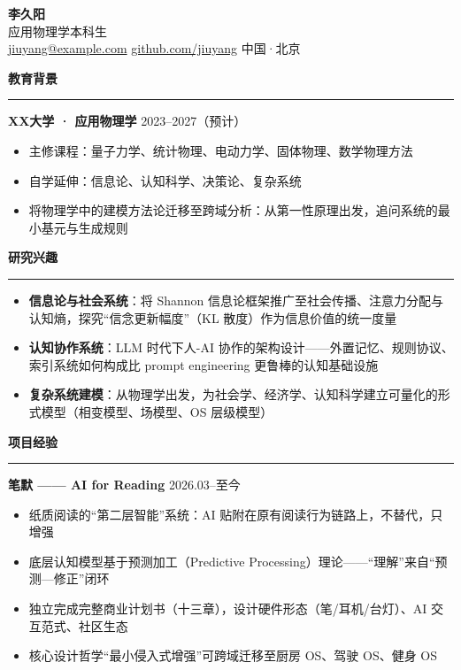 \documentclass[11pt,a4paper]{ctexart}
\newcommand{\cvsection}[1]{
  \vspace{0.8em}
  \noindent
  {\color{primary}\large\textbf{#1}}
  \vspace{0.15em}
  \hrule
  \vspace{0.5em}
}
\newcommand{\cventry}[3]{
  \noindent
  \textbf{#1} \hfill \color{gray}\small #2
  \par\vspace{0.15em}
  \begin{itemize}
    #3
  \end{itemize}
}
\begin{document}
\begin{center}
  {\color{primary}\huge\textbf{李久阳}} \\[0.3em]
  {\large 应用物理学本科生} \\[0.5em]
  {\color{gray}\small
     \href{mailto:jiuyang@example.com}{jiuyang@example.com} \quad
     \href{https://github.com/jiuyang}{github.com/jiuyang} \quad
     中国·北京
  }
\end{center}

\vspace{-0.5em}

\cvsection{ 教育背景}

\cventry{XX大学 · 应用物理学}{2023--2027（预计）}{
  \item 主修课程：量子力学、统计物理、电动力学、固体物理、数学物理方法
  \item 自学延伸：信息论、认知科学、决策论、复杂系统
  \item 将物理学中的建模方法论迁移至跨域分析：从第一性原理出发，追问系统的最小基元与生成规则
}

\cvsection{ 研究兴趣}

\begin{itemize}
  \item \textbf{信息论与社会系统}：将 Shannon 信息论框架推广至社会传播、注意力分配与认知熵，探究“信念更新幅度”（KL 散度）作为信息价值的统一度量
  \item \textbf{认知协作系统}：LLM 时代下人-AI 协作的架构设计——外置记忆、规则协议、索引系统如何构成比 prompt engineering 更鲁棒的认知基础设施
  \item \textbf{复杂系统建模}：从物理学出发，为社会学、经济学、认知科学建立可量化的形式模型（相变模型、场模型、OS 层级模型）
\end{itemize}

\cvsection{ 项目经验}

\cventry{笔默 —— AI for Reading}{2026.03--至今}{
  \item 纸质阅读的“第二层智能”系统：AI 贴附在原有阅读行为链路上，不替代，只增强
  \item 底层认知模型基于预测加工（Predictive Processing）理论——“理解”来自“预测—修正”闭环
  \item 独立完成完整商业计划书（十三章），设计硬件形态（笔/耳机/台灯）、AI 交互范式、社区生态
  \item 核心设计哲学“最小侵入式增强”可跨域迁移至厨房 OS、驾驶 OS、健身 OS
}
\end{document}
